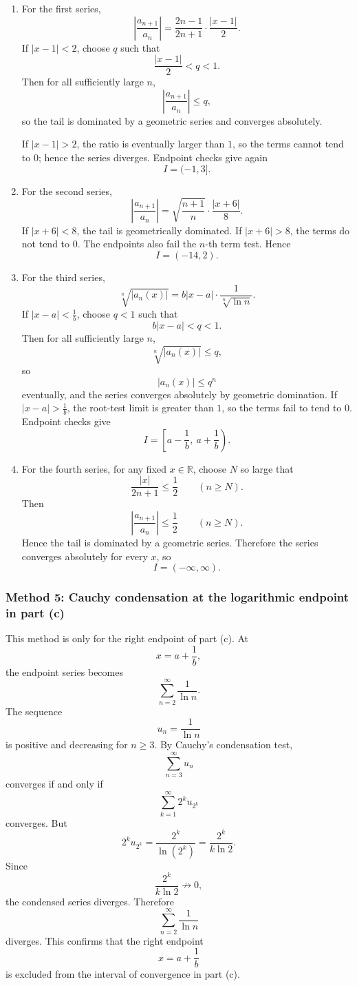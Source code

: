 \documentclass[12pt]{article}
\begin{document}
\begin{enumerate}[label=(\alph*)]
\item For the first series,
\[
\left|\frac{a_{n+1}}{a_n}\right|
=
\frac{2n-1}{2n+1}\cdot\frac{|x-1|}{2}.
\]
If \(|x-1|<2\), choose \(q\) such that
\[
\frac{|x-1|}{2}<q<1.
\]
Then for all sufficiently large \(n\),
\[
\left|\frac{a_{n+1}}{a_n}\right|\le q,
\]
so the tail is dominated by a geometric series and converges absolutely.

If \(|x-1|>2\), the ratio is eventually larger than \(1\), so the terms cannot tend to \(0\); hence the series diverges. Endpoint checks give again
\[
\boxed{I=(-1,3]}.
\]

\item For the second series,
\[
\left|\frac{a_{n+1}}{a_n}\right|
=
\sqrt{\frac{n+1}{n}}\cdot\frac{|x+6|}{8}.
\]
If \(|x+6|<8\), the tail is geometrically dominated. If \(|x+6|>8\), the terms do not tend to \(0\). The endpoints also fail the \(n\)-th term test. Hence
\[
\boxed{I=(-14,2)}.
\]

\item For the third series,
\[
\sqrt[n]{|a_n(x)|}
=
b|x-a|\cdot\frac1{\sqrt[n]{\ln n}}.
\]
If \(|x-a|<\frac1b\), choose \(q<1\) such that
\[
b|x-a|<q<1.
\]
Then for all sufficiently large \(n\),
\[
\sqrt[n]{|a_n(x)|}\le q,
\]
so
\[
|a_n(x)|\le q^n
\]
eventually, and the series converges absolutely by geometric domination. If \(|x-a|>\frac1b\), the root-test limit is greater than \(1\), so the terms fail to tend to \(0\). Endpoint checks give
\[
\boxed{I=\left[a-\frac1b,\ a+\frac1b\right)}.
\]

\item For the fourth series, for any fixed \(x\in\mathbb R\), choose \(N\) so large that
\[
\frac{|x|}{2n+1}\le \frac12
\qquad(n\ge N).
\]
Then
\[
\left|\frac{a_{n+1}}{a_n}\right|\le\frac12
\qquad(n\ge N).
\]
Hence the tail is dominated by a geometric series. Therefore the series converges absolutely for every \(x\), so
\[
\boxed{I=(-\infty,\infty)}.
\]
\end{enumerate}

\subsubsection*{Method 5: Cauchy condensation at the logarithmic endpoint in part (c)}
This method is only for the right endpoint of part (c). At
\[
x=a+\frac1b,
\]
the endpoint series becomes
\[
\sum_{n=2}^{\infty}\frac1{\ln n}.
\]
The sequence
\[
u_n=\frac1{\ln n}
\]
is positive and decreasing for \(n\ge3\). By Cauchy's condensation test,
\[
\sum_{n=3}^{\infty}u_n
\]
converges if and only if
\[
\sum_{k=1}^{\infty}2^k u_{2^k}
\]
converges. But
\[
2^k u_{2^k}
=
\frac{2^k}{\ln(2^k)}
=
\frac{2^k}{k\ln2}.
\]
Since
\[
\frac{2^k}{k\ln2}\not\to0,
\]
the condensed series diverges. Therefore
\[
\sum_{n=2}^{\infty}\frac1{\ln n}
\]
diverges. This confirms that the right endpoint
\[
x=a+\frac1b
\]
is excluded from the interval of convergence in part (c).
\end{document}
